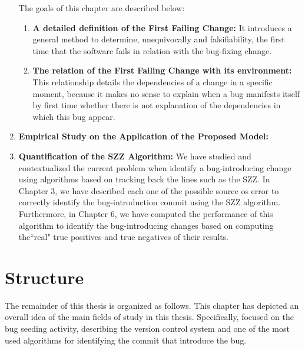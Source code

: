 \documentclass[a4paper, 12pt]{book}
\begin{document}
\begin{enumerate}
	The goals of this chapter are described below:
	\begin{enumerate}
 		 \item \textbf{A detailed definition of the First Failing Change:} It introduces a general method to determine, unequivocally and falsifiability, the first time that the software fails in relation with the bug-fixing change.
 		 \item \textbf{The relation of the First Failing Change with its environment:} This relationship details the dependencies of a change in a specific moment, because it makes no sense to explain when a bug manifests itself by first time whether there is not explanation of the dependencies in which this bug appear.
	\end{enumerate}

	\item\textbf{Empirical Study on the Application of the Proposed Model:}

	\item\textbf{Quantification of the SZZ Algorithm:}
We have studied and contextualized the current problem when identify a bug-introducing change using algorithms based on tracking back the lines such as the SZZ. In Chapter 3, we have described each one of the possible source os error to correctly identify the bug-introduction commit using the SZZ algorithm. Furthermore, in Chapter 6, we have computed the performance of this algorithm to identify the bug-introducing changes based on computing the``real" true positives and true negatives of their results.
\end{enumerate}

\section{Structure}
\label{subsec:structure}
The remainder of this thesis is organized as follows. This chapter has depicted an overall idea of the main fields of study in this thesis. Specifically, focused on the bug seeding activity, describing the version control system and one of the most used algorithms for identifying the commit that introduce the bug.
\end{document}
